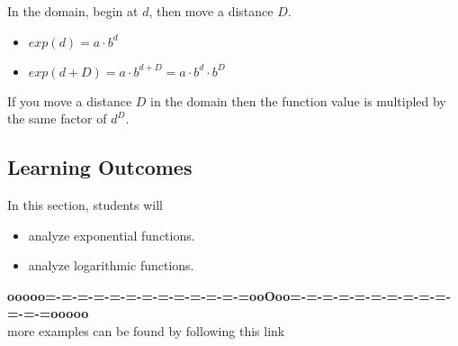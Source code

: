 \documentclass{ximera}
\begin{document}
\begin{procedure}

In the domain, begin at $d$, then move a distance $D$. \\

\begin{itemize}
\item $exp(d) = a \cdot b^d$
\item $exp(d+D) = a \cdot b^{d+D} = a \cdot b^d \cdot b^D$
\end{itemize}


If you move a distance $D$ in the domain then the function value is multipled by the same factor of $d^D$.






\end{procedure}


\subsection{Learning Outcomes}



\begin{sectionOutcomes}
In this section, students will 

\begin{itemize}
\item analyze exponential functions.
\item analyze logarithmic functions.
\end{itemize}
\end{sectionOutcomes}















\begin{center}
\textbf{\textcolor{green!50!black}{ooooo=-=-=-=-=-=-=-=-=-=-=-=-=ooOoo=-=-=-=-=-=-=-=-=-=-=-=-=ooooo}} \\

more examples can be found by following this link\\ 

\end{center}
\end{document}
